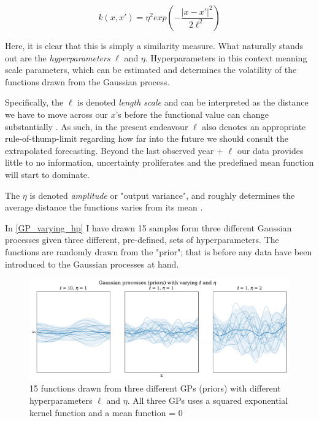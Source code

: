 \documentclass[a4paper]{article}
\begin{document}
\[
k(x,x') = \eta^2 exp\left(-\frac{|x-x'|^2}{2\ell^2}\right) \tag{7} \label{eq:k}
\]

Here, it is clear that this is simply a similarity measure. What naturally stands out are the \emph{hyperparameters} $\ell$ and $\eta$. Hyperparameters in this context meaning scale parameters, which can be estimated and determines the volatility of the functions drawn from the Gaussian process.\par

Specifically, the $\ell$ is denoted \emph{length scale} \cite[501-502]{Gelman_2013} and can be interpreted as the distance we have to move across our $x$'s before the functional value can change substantially \citep[14-15]{williams2006gaussian}. As such, in the present endeavour $\ell$ also denotes an appropriate rule-of-thump-limit regarding how far into the future we should consult the extrapolated forecasting. Beyond the last observed year + $\ell$ our data provides little to no information, uncertainty proliferates and the predefined mean function will start to dominate.\par

The $\eta$ is denoted \emph{amplitude} or "output variance", and roughly determines the average distance the functions varies from its mean \cite[502]{Gelman_2013}.\par

In \autoref{GP_varying_hp} I have drawn 15 samples form three different Gaussian processes given three different, pre-defined, sets of hyperparameters. The functions are randomly drawn from the "prior"; that is before any data have been introduced to the Gaussian processes at hand.\par

\begin{figure}[!htb]
	\centering
	\includegraphics[scale=0.47]{GP_varying_hp.pdf}
    \caption{\footnotesize{15 functions drawn from three different GPs (priors) with different hyperparameters $\ell$ and $\eta$. All three GPs uses a squared exponential kernel function and a mean function = 0}}\label{GP_varying_hp}
\end{figure}
\end{document}
